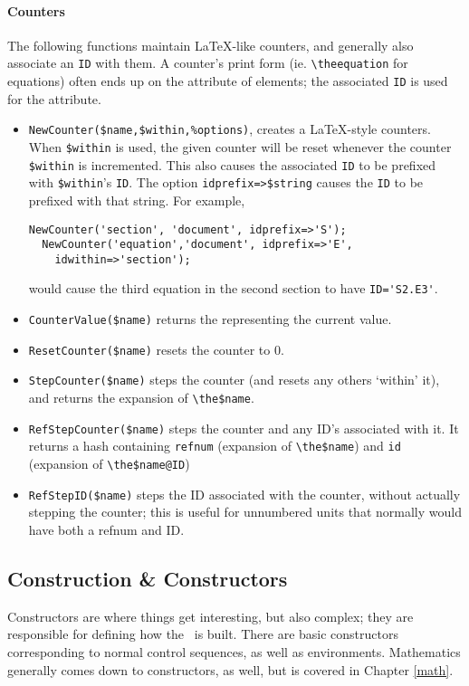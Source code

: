 \documentclass{book}
\newcommand{\ltxcode}{\lstinline[style=inlinelatexml]}
\newcommand{\xmlcode}{\lstinline[style=xml]}
\begin{document}
\paragraph{Counters}
The following functions maintain \LaTeX-like counters, and generally
also associate an \texttt{ID} with them.  A counter's print form
(ie. \verb|\theequation| for equations) often ends up on the  attribute
of elements; the associated \texttt{ID} is used for the  attribute.
\begin{itemize}
\item \ltxcode|NewCounter($name,$within,%
  creates a \LaTeX-style counters.  When \ltxcode|$within| is used, 
  the given counter will be reset whenever the counter \ltxcode|$within| is incremented.
  This also causes the associated \texttt{ID} to be prefixed with \ltxcode|$within|'s \texttt{ID}.
  The option \ltxcode|idprefix=>$string| causes the \texttt{ID} to be prefixed with that string.
  For example,
\begin{lstlisting}[style=latexml]
  NewCounter('section', 'document', idprefix=>'S');
  NewCounter('equation','document', idprefix=>'E',
    idwithin=>'section');
\end{lstlisting}
would cause the third equation in the second section to have \xmlcode{ID='S2.E3'}.
\item  \ltxcode|CounterValue($name)| returns the  representing the current value.
\item  \ltxcode|ResetCounter($name)| resets the counter to 0.
\item \ltxcode|StepCounter($name)| steps the counter (and resets any others `within' it),
  and returns the expansion of \verb|\the$name|.
\item \ltxcode|RefStepCounter($name)| steps the counter and any ID's associated with it.
  It returns a hash containing \texttt{refnum} (expansion of \verb|\the$name|)
  and \texttt{id} (expansion of \verb|\the$name@ID|)
\item \ltxcode|RefStepID($name)| steps the ID associated with the counter, without
  actually stepping the counter; this is useful for unnumbered units that normally
  would have both a refnum and ID.
\end{itemize}

\subsection[Construction]{Construction \& Constructors}\label{customization.latexml.construction}
Constructors are where things get interesting, but also complex; they are
responsible for defining how the \XML\ is built.  There are basic
constructors corresponding to normal control sequences, as well as
environments. Mathematics generally comes down to constructors, as well,
but is covered in Chapter \ref{math}.
\end{document}
